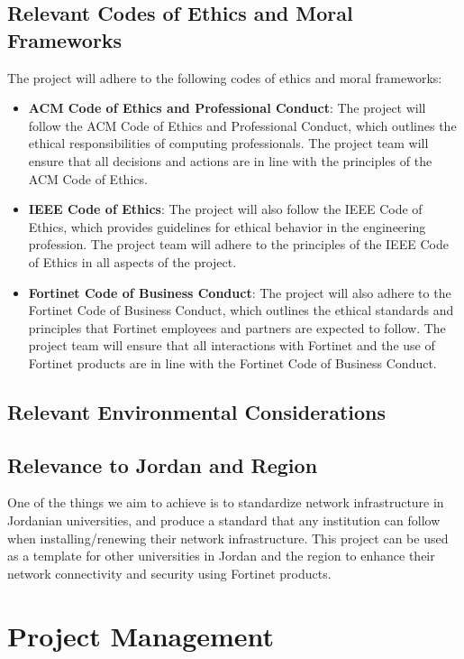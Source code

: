 \documentclass[12pt]{report}
\begin{document}
\section{Relevant Codes of Ethics and Moral Frameworks}
The project will adhere to the following codes of ethics and moral frameworks:
\begin{itemize}
    \item \textbf{ACM Code of Ethics and Professional Conduct}: The project will follow the ACM Code of Ethics and Professional Conduct, which outlines the ethical responsibilities of computing professionals. The project team will ensure that all decisions and actions are in line with the principles of the ACM Code of Ethics. \cite{ACM}
    \item \textbf{IEEE Code of Ethics}: The project will also follow the IEEE Code of Ethics, which provides guidelines for ethical behavior in the engineering profession. The project team will adhere to the principles of the IEEE Code of Ethics in all aspects of the project. \cite{IEEE}
    \item \textbf{Fortinet Code of Business Conduct}: The project will also adhere to the Fortinet Code of Business Conduct, which outlines the ethical standards and principles that Fortinet employees and partners are expected to follow. The project team will ensure that all interactions with Fortinet and the use of Fortinet products are in line with the Fortinet Code of Business Conduct. \cite{FortinetCOC}
\end{itemize}
\section{Relevant Environmental Considerations}
\section{Relevance to Jordan and Region}
One of the things we aim to achieve is to standardize network infrastructure in Jordanian universities, and produce a standard that any institution can follow when installing/renewing their network infrastructure. This project can be used as a template for other universities in Jordan and the region to enhance their network connectivity and security using Fortinet products.

\chapter{Project Management}
\end{document}
